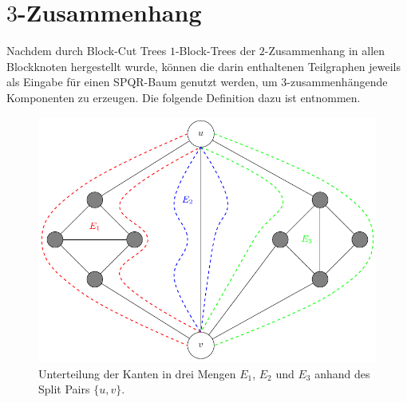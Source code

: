 \section{$3$-Zusammenhang}

Nachdem durch Block-Cut Trees \bzw $1$-Block-Trees der $2$-Zusammenhang in allen Blockknoten hergestellt wurde, können die darin enthaltenen Teilgraphen jeweils als Eingabe für einen SPQR-Baum genutzt werden, um $3$-zusammenhängende Komponenten zu erzeugen.
Die folgende Definition dazu ist \cite{GuM00} entnommen.

\begin{figure}[H]
  \centering
  \includegraphics[width=\textwidth,height=\textheight,keepaspectratio]{bilder/Split-Kantenmengen.pdf}
  \caption{Unterteilung der Kanten in drei Mengen $E_1$, $E_2$ und $E_3$ anhand des Split Pairs $\{u, v\}$.}
  \label{fig:Split-Kantenmengen}
\end{figure}

